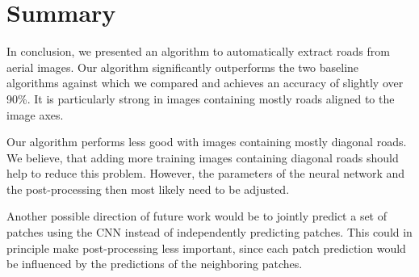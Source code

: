 \documentclass[10pt,conference,compsocconf]{IEEEtran}
\begin{document}
\section{Summary}
\label{sec:summary}
In conclusion, we presented an algorithm to automatically extract roads from aerial images. Our algorithm significantly outperforms the two baseline algorithms against which we compared and achieves an accuracy of slightly over 90\%. It is particularly strong in images containing mostly roads aligned to the image axes.

\par 
Our algorithm performs less good with images containing mostly diagonal roads. We believe, that adding more training images containing diagonal roads should help to reduce this problem. However, the parameters of the neural network and the post-processing then most likely need to be adjusted. 

\par 
Another possible direction of future work would be to jointly predict a set of patches using the CNN instead of independently predicting patches. This could in principle make post-processing less important, since each patch prediction would be influenced by the predictions of the neighboring patches. 



\end{document}
